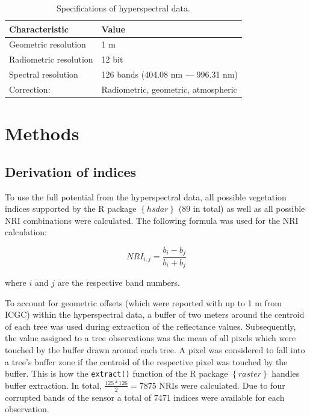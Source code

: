 \documentclass[letterpaper, peerreview]{IEEEtran}
\begin{document}

\begin{table}[t]
\centering
\caption[t]{Specifications of hyperspectral data.}
\begingroup
\begin{tabular}{ll}
	\\
	Characteristic         & Value                               \\
	\toprule
	Geometric resolution   & 1 m                                 \\
	Radiometric resolution & 12 bit                              \\
	Spectral resolution    & 126 bands (404.08 nm --- 996.31 nm) \\
	Correction:            & Radiometric, geometric, atmospheric
\end{tabular}
\endgroup\label{tab:hyperparameter_limits}
\end{table}

\section{Methods}

\subsection{Derivation of indices}
\noindent To use the full potential from the hyperspectral data, all possible vegetation indices supported by the R package $\left\{hsdar\right\}$ (89 in total) as well as all possible \ac{NRI} combinations were calculated.
The following formula was used for the NRI calculation:

\begin{equation}
	NRI_{i,j} = \frac{b_{i} - b_{j}}{b_{i} + b_{j}}
\end{equation}

\noindent
where \(i\) and \(j\) are the respective band numbers.

\bigbreak{}

\noindent To account for geometric offsets (which were reported with up to 1 m from \ac{ICGC}) within the hyperspectral data, a buffer of two meters around the centroid of each tree was used during extraction of the reflectance values.
Subsequently, the value assigned to a tree observations was the mean of all pixels which were touched by the buffer drawn around each tree.
A pixel was considered to fall into a tree's buffer zone if the centroid of the respective pixel was touched by the buffer.
This is how the \texttt{extract()} function of the R package $\left\{raster\right\}$ handles buffer extraction.
In total, \(\frac{125*126}{2} = 7875\) NRIs were calculated.
Due to four corrupted bands of the sensor a total of 7471 indices were available for each observation.
\end{document}
